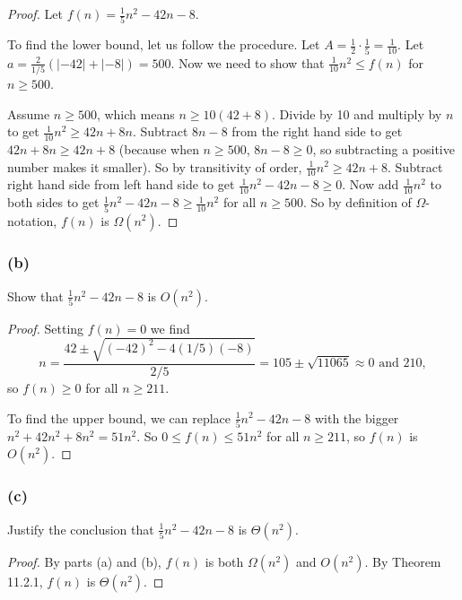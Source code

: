 \documentclass[14pt]{extarticle}
\newcommand{\dps}{\displaystyle}
\begin{document}
\begin{proof}
    Let \(\dps f(n) = \frac{1}{5}n^2 - 42n - 8\).

    To find the lower bound, let us follow the procedure. Let \(\dps A = \frac{1}{2} \cdot \frac{1}{5} = \frac{1}{10}\).
    Let \(\dps a = \frac{2}{1/5}(|-42| + |-8|) = 500\). Now we need to show that \(\dps \frac{1}{10}n^2 \leq f(n)\) for
    \(n \geq 500\).

    Assume \(n \geq 500\), which means \(n \geq 10(42+8)\). Divide by 10 and multiply by \(n\) to get \(\dps \frac{1}{10}n^2 \geq
    42n + 8n\). Subtract \(8n-8\) from the right hand side to get \(42n + 8n \geq 42n + 8\) (because when \(n \geq 500\),
    \(8n - 8 \geq 0\), so subtracting a positive number makes it smaller). So by transitivity of order, \(\dps \frac{1}{10}n^2
    \geq 42n + 8\). Subtract right hand side from left hand side to get \(\dps \frac{1}{10}n^2 - 42n - 8 \geq 0\). Now add
    \(\dps \frac{1}{10}n^2\) to both sides to get \(\dps \frac{1}{5}n^2- 42n - 8 \geq \frac{1}{10}n^2\) for all \(n \geq 500\).
    So by definition of \(\Omega\)-notation, \(f(n)\) is \(\Omega(n^2)\).
\end{proof}

\subsubsection{(b)}
Show that \(\frac{1}{5}n^2 - 42n - 8\) is \(O(n^2)\).
\begin{proof}
    Setting \(f(n) = 0\) we find
    \[
        n = \frac{42 \pm \sqrt{(-42)^2-4(1/5)(-8)}}{2/5} = 105 \pm \sqrt{11065} \approx 0 \text{ and } 210,
    \]
    so \(f(n) \geq 0\) for all \(n \geq 211\).

    To find the upper bound, we can replace \(\frac{1}{5}n^2 - 42n - 8\) with the bigger \(n^2 + 42n^2 + 8n^2 = 51n^2\). So
    \(0 \leq f(n) \leq 51n^2\) for all \(n \geq 211\), so \(f(n)\) is \(O(n^2)\).
\end{proof}

\subsubsection{(c)}
Justify the conclusion that \(\frac{1}{5}n^2 - 42n - 8\) is \(\Theta(n^2)\).

\begin{proof}
    By parts (a) and (b), \(f(n)\) is both \(\Omega(n^2)\) and \(O(n^2)\). By Theorem 11.2.1, \(f(n)\) is \(\Theta(n^2)\).
\end{proof}
\end{document}
